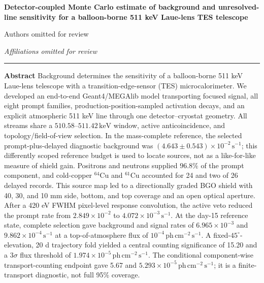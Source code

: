 \documentclass[11pt]{article}
\newcommand{\keV}{\ensuremath{\,\mathrm{keV}}}
\newcommand{\phcms}{\ensuremath{\,\mathrm{ph\,cm^{-2}\,s^{-1}}}}
\newcommand{\cps}{\ensuremath{\,\mathrm{s^{-1}}}}
\begin{document}
\thispagestyle{fancy}
\begin{flushleft}
{\LARGE\bfseries Detector-coupled Monte Carlo estimate of background and unresolved-line sensitivity for a balloon-borne 511 keV Laue-lens TES telescope\par}
\vspace{1.1em}
{\large Authors omitted for review\par}
\vspace{0.3em}
{\normalsize\itshape Affiliations omitted for review\par}
\end{flushleft}
\vspace{0.7em}
\noindent\rule{\textwidth}{0.4pt}
\vspace{0.5em}

\noindent\textbf{Abstract}\hspace{0.7em}
Background determines the sensitivity of a balloon-borne 511 keV Laue-lens
telescope with a transition-edge-sensor (TES) microcalorimeter. We developed an
end-to-end Geant4/MEGAlib model transporting focused signal, all eight prompt
families, production-position-sampled activation decays, and an explicit
atmospheric 511 keV line through one detector--cryostat geometry. All streams
share a $510.58$--$511.42\keV$ window, active anticoincidence, and
topology/field-of-view selection. In the mass-complete reference, the selected
prompt-plus-delayed diagnostic background was $(4.643\pm0.543)\times10^{-2}\cps$;
this differently scoped reference budget is used to locate sources, not as a
like-for-like measure of shield gain. Positrons and neutrons supplied
$96.8\%$ of the prompt component, and cold-copper $^{64}$Cu and $^{61}$Cu
accounted for 24 and two of 26 delayed records. This source map led to a
directionally graded BGO shield with 40, 30, and 10 mm side, bottom, and top
coverage and an open optical aperture. After a 420 eV FWHM pixel-level response
convolution, the active veto reduced the prompt rate from
$2.849\times10^{-2}$ to $4.072\times10^{-3}\cps$. At the day-15 reference
state, complete selection gave background and signal rates of
$6.965\times10^{-3}$ and
$9.862\times10^{-4}\cps$ at a top-of-atmosphere flux of $10^{-4}\phcms$. A
fixed-$45^\circ$-elevation, 20 d trajectory fold yielded a central counting
significance of 15.20 and a $3\sigma$ flux threshold of
$1.974\times10^{-5}\phcms$. The conditional component-wise transport-counting
endpoint gave 5.67 and $5.293\times10^{-5}\phcms$; it is a finite-transport
diagnostic, not full 95\% coverage.
\end{document}
